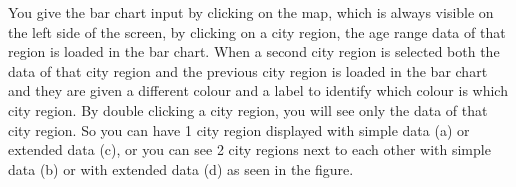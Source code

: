 \documentclass[a4paper,twoside,11pt]{article}
\begin{document}
\newline
\newline
\newline
You give the bar chart input by clicking on the map, which is always visible on the left side of the screen, by clicking on a city region, the age range data of that region is loaded in the bar chart. When a second city region is selected both the data of that city region and the previous city region is loaded in the bar chart and they are given a different colour and a label to identify which colour is which city region. By double clicking a city region, you will see only the data of that city region. \newline
So you can have 1 city region displayed with simple data (a) or extended data (c), or you can see 2 city regions next to each other with simple data (b) or with extended data (d) as seen in the figure. \newline
\end{document}

